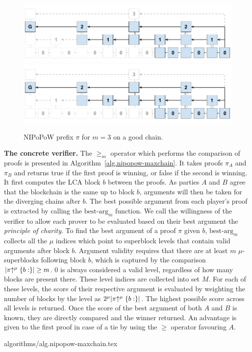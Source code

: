 \begin{figure}[h]
    \caption{
    NIPoPoW prefix $\pi$ for $m = 3$ on a good chain.
    }
    \centering
    \iftwocolumn
        \includegraphics[width=\columnwidth,keepaspectratio]{figures/non-interactive-popow.png}
    \else
        \includegraphics[width=0.7\columnwidth,keepaspectratio]{figures/non-interactive-popow.png}
    \fi
    \label{fig.nipopow}
\end{figure}

\noindent
\textbf{The concrete verifier.}
The $\geq_m$ operator which performs the comparison of proofs is presented in
Algorithm~\ref{alg.nipopow-maxchain}. It takes proofs $\pi_A$ and $\pi_B$ and
returns true if the first proof is winning, or false if the second is winning.
It first computes the LCA block $b$ between the proofs. As parties $A$ and $B$
agree that the blockchain is the same up to block $b$, arguments will then be
taken for the diverging chains after $b$. The best possible argument from each
player's proof is extracted by calling the $\text{best-arg}_m$ function. We call
the willingness of the verifier to allow each prover to be evaluated based on
their best argument the \textit{principle of charity}. To find the best argument
of a proof $\pi$ given $b$, $\text{best-arg}_m$ collects all the $\mu$ indices
which point to superblock levels that contain valid arguments after block $b$.
Argument validity requires that there are at least $m$ $\mu$-superblocks
following block $b$, which is captured by the comparison
$|\pi\negthickspace\uparrow^\mu\{b:\}| \geq m$. $0$ is always considered a valid level,
regardless of how many blocks are present there. These level indices are
collected into set $M$. For each of these levels, the score of their respective
argument is evaluated by weighting the number of blocks by the level as
$2^\mu|\pi\negthickspace\uparrow^\mu\{b:\}|$. The highest possible score across all levels is
returned. Once the score of the best argument of both $A$ and $B$ is known, they
are directly compared and the winner returned.  An advantage is given to the
first proof in case of a tie by using the $\geq$ operator favouring $A$.

{algorithms/alg.nipopow-maxchain.tex}
